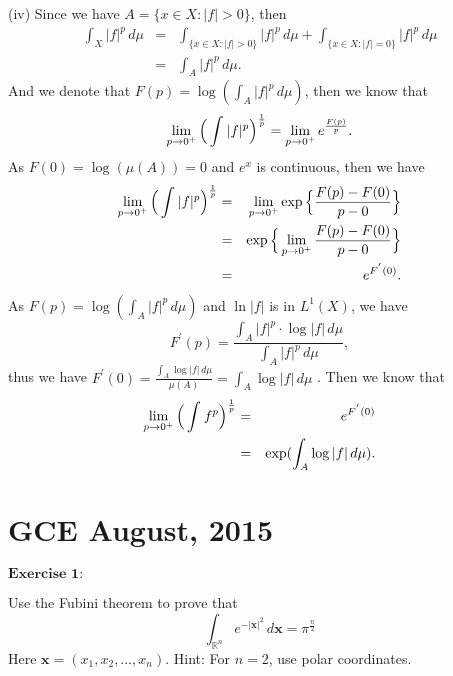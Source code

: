 \documentclass[12pt]{article}
\begin{document}
(iv) Since we have $A = \{x \in X: |f| > 0\}$, then
\begin{eqnarray*}
    \int_{X}^{} |f|^{p} \, d \mu & = & \int_{\{x \in X: |f| > 0\}}^{} |f|^{p} \, d \mu + \int_{\{x \in X: |f| = 0\}}^{} |f|^{p} \, d \mu \\
    & = & \int_{A}^{} |f|^{p} \, d \mu.
\end{eqnarray*}
And we denote that $F(p) = \log (\int_{A}^{} |f|^{p} \, d \mu)$, then we know that
\begin{equation*}
    \lim_{p \to 0^{+}} \Big{(} \int_{}^{} |f|^{p} \Big{)}^{\frac{1}{p}} = \lim_{p \to 0^{+}} e^{\frac{F(p)}{p}}.
\end{equation*}
As $F(0) = \log(\mu(A)) = 0$ and $e^{x}$ is continuous, then we have
\begin{eqnarray*}
    \lim_{p \to 0^{+}} \Big{(} \int_{}^{} |f|^{p} \Big{)}^{\frac{1}{p}} & = & \lim_{p \to 0^{+}} \exp \Big{\{} \frac{F(p) - F(0)}{p - 0} \Big{\}} \\
    & = & \exp \Big{\{} \lim_{p \to 0^{+}} \frac{F(p) - F(0)}{p - 0} \Big{\}} \\
    & = & e^{F^{'}(0)}.
\end{eqnarray*}
As $F(p) = \log (\int_{A}^{} |f|^{p} \, d \mu)$ and $\ln |f|$ is in $L^{1}(X)$, we have 
\begin{equation*}
    F^{'}(p) = \frac{\int_{A}^{} |f|^{p} \cdot \log |f| \, d \mu}{\int_{A}^{} |f|^{p} \, d \mu},
\end{equation*}
thus we have $F^{'}(0) = \frac{\int_{A}^{} \log |f| \, d \mu}{\mu(A)} = \int_{A}^{} \log |f| \, d \mu$ . Then we know that
\begin{eqnarray*}
    \lim_{p \to 0^{+}} \Big{(} \int_{}^{} f^{p} \Big{)}^{\frac{1}{p}} & = & e^{F^{'}(0)} \\
    & = & \exp (\int_{A}^{} \log |f| \, d \mu).
\end{eqnarray*}

\newpage

\section{GCE August, 2015}

$\textbf{Exercise 1:}$

Use the Fubini theorem to prove that
\begin{equation*}
    \int_{\mathbb{R}^{n}}^{} e^{- |\textbf{x}|^{2}} \, d \textbf{x} = \pi^{\frac{n}{2}}
\end{equation*}
Here $\textbf{x} = (x_{1}, x_{2}, \dots, x_{n})$. Hint: For $n = 2$, use polar coordinates.
\end{document}
